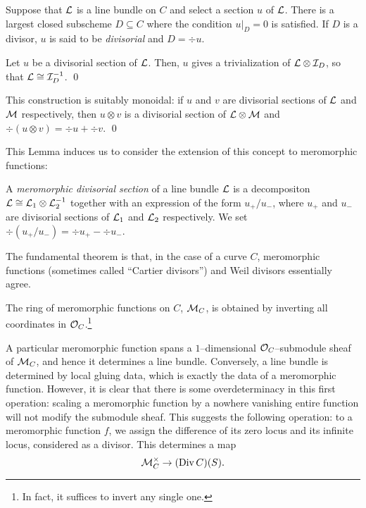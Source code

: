 \begin{definition}
Suppose that $\mathcal{L}$ is a line bundle on $C$ and select a section $u$ of $\mathcal{L}$.  There is a largest closed subscheme $D \subseteq C$ where the condition $u|_D = 0$ is satisfied.  If $D$ is a divisor, $u$ is said to be \textit{divisorial} and $D = \div u$.
\end{definition}

\begin{lemma}
Let $u$ be a divisorial section of $\mathcal{L}$.  Then, $u$ gives a trivialization of $\mathcal{L} \otimes \mathcal{I}_D$, so that $\mathcal{L} \cong \mathcal{I}_D^{-1}$. \qed
\end{lemma}

\begin{lemma}
This construction is suitably monoidal: if $u$ and $v$ are divisorial sections of $\mathcal{L}$ and $\mathcal{M}$ respectively, then $u \otimes v$ is a divisorial section of $\mathcal{L} \otimes \mathcal{M}$ and $\div(u \otimes v) = \div u + \div v$. \qed
\end{lemma}

This Lemma induces us to consider the extension of this concept to meromorphic functions:
\begin{definition}
A \textit{meromorphic divisorial section} of a line bundle $\mathcal{L}$ is a decompositon $\mathcal{L} \cong \mathcal{L}_1 \otimes \mathcal{L}_2^{-1}$ together with an expression of the form $u_+ / u_-$, where $u_+$ and $u_-$ are divisorial sections of $\mathcal{L}_1$ and $\mathcal{L}_2$ respectively.  We set $\div(u_+ / u_-) = \div u_+ - \div u_-$.
\end{definition}

The fundamental theorem is that, in the case of a curve $C$, meromorphic functions (sometimes called ``Cartier divisors'') and Weil divisors essentially agree.

\begin{definition}
The ring of meromorphic functions on $C$, $\mathcal{M}_C$, is obtained by inverting all coordinates in $\mathcal{O}_C$.\footnote{In fact, it suffices to invert any single one.}
\end{definition}

A particular meromorphic function spans a $1$--dimensional $\mathcal{O}_C$--submodule sheaf of $\mathcal{M}_C$, and hence it determines a line bundle.  Conversely, a line bundle is determined by local gluing data, which is exactly the data of a meromorphic function.  However, it is clear that there is some overdeterminacy in this first operation: scaling a meromorphic function by a nowhere vanishing entire function will not modify the submodule sheaf.  This suggests the following operation: to a meromorphic function $f$, we assign the difference of its zero locus and its infinite locus, considered as a divisor.  This determines a map \[\mathcal{M}_C^\times \to (\operatorname{Div} C)(S).\]

